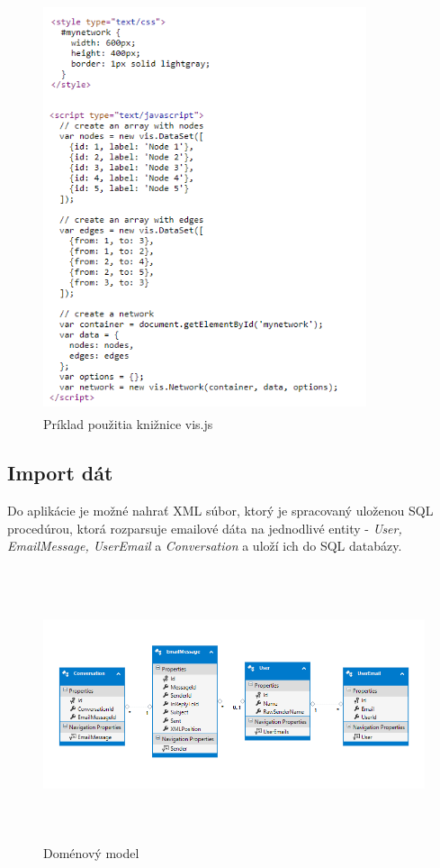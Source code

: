 \documentclass[slovak,master,public,dept460,male,cpdeclaration,oneside]{diploma}
\begin{document}
\begin{figure}[H]
\centering
\includegraphics[width=9.5cm, height=12cm]{figures/vis_basiccode}
\caption{Príklad použitia knižnice vis.js}
\end{figure}




\subsection{Import dát}
Do aplikácie je možné nahrať XML súbor, ktorý je spracovaný uloženou SQL procedúrou, ktorá rozparsuje emailové dáta na jednodlivé entity - \textit{User, EmailMessage, UserEmail} a \textit{Conversation} a uloží ich do SQL databázy.


\begin{figure}[H]
\centering
\includegraphics[width=16cm, height=8cm]{figures/domain_model}
\caption{Doménový model}
\end{figure}
\end{document}
